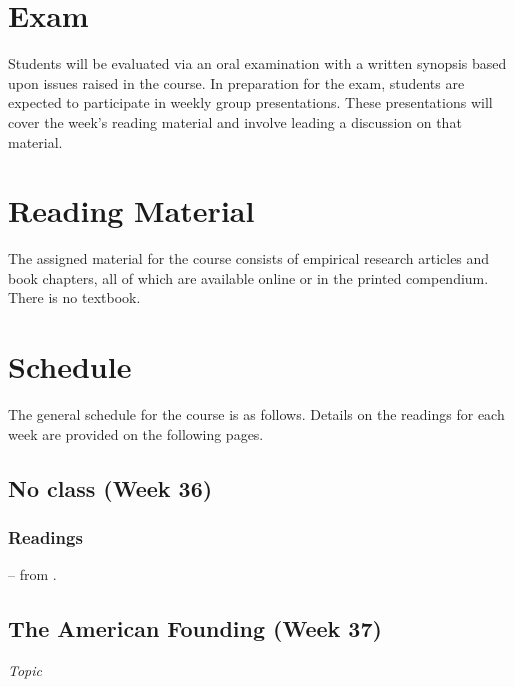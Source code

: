 \documentclass[12pt,a4paper]{article}
\newcommand{\reading}[2][]{\noindent --{#1} from \bibentry{#2}.\vspace{.25em}\\}
\begin{document}
\section{Exam}
Students will be evaluated via an oral examination with a written synopsis based upon issues raised in the course. In preparation for the exam, students are expected to participate in weekly group presentations. These presentations will cover the week's reading material and involve leading a discussion on that material.

\section{Reading Material}
The assigned material for the course consists of empirical research articles and book chapters, all of which are available online or in the printed compendium. There is no textbook.

\section{Schedule}
The general schedule for the course is as follows. Details on the readings for each week are provided on the following pages.

\secttoc


\clearpage


\subsection{No class (Week 36)}
\vspace{1em}

\subsubsection*{Readings}
\reading{Noel2010} %


\clearpage
\subsection{The American Founding (Week 37)}
\emph{Topic}

\vspace{1em}
\end{document}
